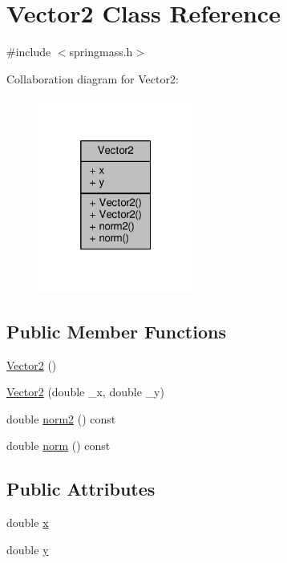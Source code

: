 \hypertarget{classVector2}{}\section{Vector2 Class Reference}
\label{classVector2}


{\ttfamily \#include $<$springmass.\+h$>$}



Collaboration diagram for Vector2\+:
\nopagebreak
\begin{figure}[H]
\begin{center}
\leavevmode
\includegraphics[width=145pt]{classVector2__coll__graph}
\end{center}
\end{figure}
\subsection*{Public Member Functions}
\begin{DoxyCompactItemize}
\item 
\hyperlink{classVector2_a22104d1809be26a419ef1f959e3761bf}{Vector2} ()
\item 
\hyperlink{classVector2_a861062b13bd0e92d50b3ffd90c9edd77}{Vector2} (double \+\_\+x, double \+\_\+y)
\item 
double \hyperlink{classVector2_a08452f15b4693e07c992b77053b24d89}{norm2} () const
\item 
double \hyperlink{classVector2_aa237ac7d74130707d189c3740bc34f94}{norm} () const
\end{DoxyCompactItemize}
\subsection*{Public Attributes}
\begin{DoxyCompactItemize}
\item 
double \hyperlink{classVector2_a61d73d9036ccbb3257fbe595c014a1d0}{x}
\item 
double \hyperlink{classVector2_a4df9b2a8e79e6e30a7a3b34722d8b8b8}{y}
\end{DoxyCompactItemize}


